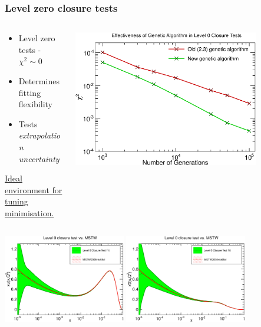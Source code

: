 \documentclass[10pt]{beamer}
\begin{document}
\begin{frame}
\frametitle{Level zero closure tests}

\begin{columns}
  \begin{column}{0.5\textwidth}
  \begin{itemize}
  \item Level zero tests - $\chi^2 \sim 0$
  \item Determines fitting flexibility
  \item Tests \emph{extrapolation uncertainty} 
  \end{itemize}
  \vskip15pt
  \underline{\small Ideal environment for tuning minimisation.}
   \end{column}
  
    \begin{column}{0.5\textwidth}
 \includegraphics[width=0.8\textwidth]{figures/chi2vslength.eps}\\

  \end{column}  
  \end{columns}


\begin{center}
\includegraphics[width=0.4\textwidth]{figures/xu-ctlvl0_vs_MSTW_initscale.eps}
\includegraphics[width=0.4\textwidth]{figures/xubar-ctlvl0_vs_MSTW_initscale.eps}

\end{center}

\end{frame}
\end{document}

